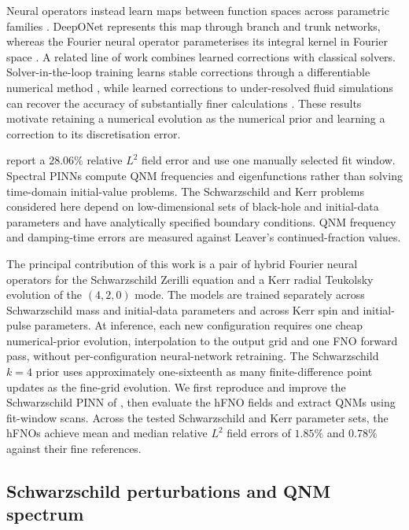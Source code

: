 \documentclass[11pt,a4paper]{article}
\theoremstyle{definition}
\begin{document}
Neural operators instead learn maps between function spaces across
parametric families \citep{Lu2021deeponet,Li2021fno,Kovachki2023neuralop}.
DeepONet represents this map through branch and trunk networks,
whereas the Fourier neural operator parameterises its integral kernel
in Fourier space \citep{Lu2021deeponet,Li2021fno}. A related line of
work combines learned corrections with classical solvers.
Solver-in-the-loop training learns stable corrections through a
differentiable numerical method \citep{Um2020solverloop}, while
learned corrections to under-resolved fluid simulations can recover
the accuracy of substantially finer calculations
\citep{Kochkov2021mlcfd}. These results motivate retaining a numerical
evolution as the numerical prior and learning a correction to its
discretisation error.

\citet{Patel2024pinn} report a $28.06\%$ relative $L^2$ field error
and use one manually selected fit window. Spectral PINNs compute QNM
frequencies and eigenfunctions rather than solving time-domain
initial-value problems. The Schwarzschild and Kerr problems considered
here depend on low-dimensional sets of black-hole and initial-data
parameters and have analytically specified boundary conditions.
QNM frequency and damping-time errors are measured against Leaver's
continued-fraction values.

The principal contribution of this work is a pair of hybrid Fourier
neural operators for the Schwarzschild Zerilli equation and a Kerr
radial Teukolsky evolution of the $(4,2,0)$ mode. The models are
trained separately across Schwarzschild mass and initial-data
parameters and across Kerr spin and initial-pulse parameters. At
inference, each new configuration requires one cheap numerical-prior
evolution, interpolation to the output grid and one FNO forward pass,
without per-configuration neural-network retraining. The Schwarzschild
$k=4$ prior uses approximately one-sixteenth as many finite-difference
point updates as the fine-grid evolution. We first reproduce and
improve the Schwarzschild PINN of \citet{Patel2024pinn}, then evaluate
the hFNO fields and extract QNMs using fit-window scans. Across the
tested Schwarzschild and Kerr parameter sets, the hFNOs achieve mean
and median relative $L^2$ field errors of $1.85\%$ and $0.78\%$
against their fine references.

\subsection{Schwarzschild perturbations and QNM spectrum}
\label{sec:bg-zerilli}
\end{document}
